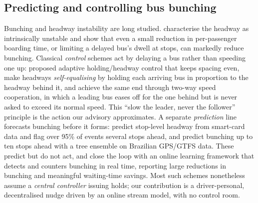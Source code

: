 \documentclass[final,5p,times,twocolumn,authoryear]{elsarticle}
\begin{document}
\subsection{Predicting and controlling bus bunching}
\label{sec:rw-bunching}
Bunching and headway instability are long studied. \citet{Enayatollahi2019} characterise the
headway as intrinsically unstable and show that even a small reduction in per-passenger boarding
time, or limiting a delayed bus's dwell at stops, can markedly reduce bunching. Classical
\emph{control} schemes act by delaying a bus rather than speeding one up: \citet{Daganzo2009}
proposed adaptive holding/headway control that keeps spacing even, \citet{Bartholdi2012} make
headways \emph{self-equalising} by holding each arriving bus in proportion to the headway behind
it, and \citet{DaganzoPilachowski2011} achieve the same end through two-way speed cooperation, in
which a leading bus eases off for the one behind but is never asked to exceed its normal speed.
This ``slow the leader, never the follower'' principle is the action our advisory approximates. A
separate \emph{prediction} line forecasts bunching before it forms: \citet{Yu2016} predict
stop-level headway from smart-card data and flag over 95\% of events several stops ahead, and
\citet{BorgesSantos2022} predict bunching up to ten stops ahead with a tree ensemble on Brazilian
GPS/GTFS data. These predict but do not act, and \citet{MoreiraMatias2016} close the loop with an
online learning framework that detects and counters bunching in real time, reporting large
reductions in bunching and meaningful waiting-time savings. Most such schemes nonetheless assume a
\emph{central controller} issuing holds; our contribution is a driver-personal, decentralised
nudge driven by an online stream model, with no control room.
\end{document}
